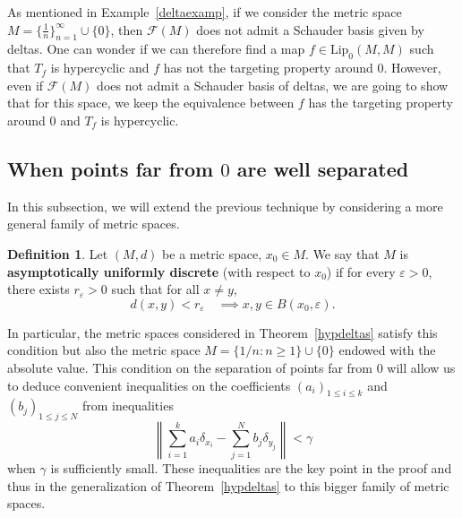 \documentclass[12pt,english]{amsart}
\numberwithin{equation}{section}
\theoremstyle{plain}
\theoremstyle{definition}
\newtheorem{definition}[theorem]{Definition}
\def\lip{ \text{Lip}}
\begin{document}
As mentioned in Example~\ref{deltaexamp}, if we consider the metric space $M=\{\frac{1}{n}\}_{n=1}^\infty \cup\{0\}$, then 
$\mathcal{F}(M)$ does not admit a Schauder basis given by deltas. One can wonder if we can therefore find a map $f\in \lip_0(M,M)$ such that $T_f$ is hypercyclic and $f$ has not the targeting property around $0$. However, even if $\mathcal{F}(M)$ does not admit a Schauder basis of deltas, we are going to show that for this space, we keep the equivalence between $f$ has the targeting property around $0$ and $T_f$ is hypercyclic. 


\subsection{When points far from $0$ are well separated}

In this subsection, we will extend the previous technique by considering a more general family of metric spaces.

\begin{definition}
    Let $(M,d)$ be a metric space, $x_0\in M$. We say that $M$ is \textbf{asymptotically uniformly discrete} (with respect to $x_0$) if for every $\varepsilon>0$, there exists $r_{\varepsilon}>0$ such that for all $x\ne y$,
\[d(x,y)<r_{\varepsilon}\quad \implies x,y\in B(x_0,\varepsilon).\]
\end{definition}

In particular, the metric spaces considered in Theorem~\ref{hypdeltas} satisfy this condition but also the metric space $M=\{1/n:n\ge 1\}\cup\{0\}$ endowed with the absolute value. This condition on the separation of points far from $0$ will allow us to deduce convenient inequalities on the coefficients $(a_i)_{1\le i\le k}$ and $(b_j)_{1\le j\le N}$ from inequalities
\[\left\|\sum_{i=1}^k a_i \delta_{x_i}-\sum_{j=1}^N b_j \delta_{y_j}\right\|<\gamma\]
when $\gamma$ is sufficiently small. These inequalities are the key point in the proof and thus in the generalization of Theorem~\ref{hypdeltas} to this bigger family of metric spaces.
\end{document}
